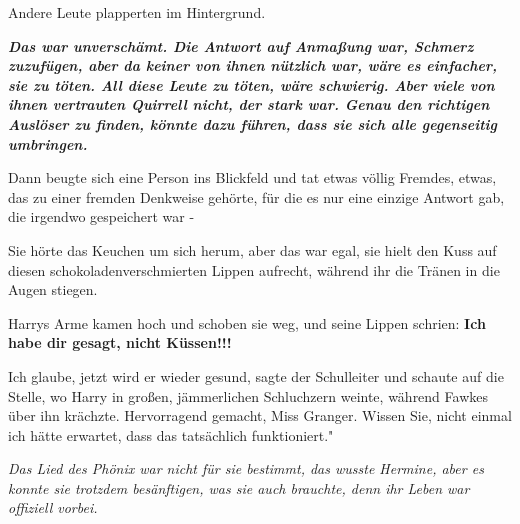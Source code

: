 Andere Leute plapperten im Hintergrund.

\textbf{\emph{Das war unverschämt. Die Antwort auf Anmaßung war, Schmerz
zuzufügen, aber da keiner von ihnen nützlich war, wäre es einfacher, sie zu
töten. All diese Leute zu töten, wäre schwierig. Aber viele von ihnen vertrauten
Quirrell nicht, der stark war. Genau den richtigen Auslöser zu finden, könnte
dazu führen, dass sie sich alle gegenseitig umbringen.}}

Dann beugte sich eine Person ins Blickfeld und tat etwas völlig Fremdes, etwas,
das zu einer fremden Denkweise gehörte, für die es nur eine einzige Antwort gab,
die irgendwo gespeichert war -

Sie hörte das Keuchen um sich herum, aber das war egal, sie hielt den Kuss auf
diesen schokoladenverschmierten Lippen aufrecht, während ihr die Tränen in die
Augen stiegen.

Harrys Arme kamen hoch und schoben sie weg, und seine Lippen schrien: \textbf{
\glqq{}Ich habe dir gesagt, nicht Küssen!!!\grqq{}}

\glqq{}Ich glaube, jetzt wird er wieder gesund\grqq{}, sagte der Schulleiter und
schaute auf die Stelle, wo Harry in großen, jämmerlichen Schluchzern weinte,
während Fawkes über ihn krächzte. \glqq{}Hervorragend gemacht, Miss Granger.
Wissen Sie, nicht einmal ich hätte erwartet, dass das tatsächlich funktioniert."

\emph{Das Lied des Phönix war nicht für sie bestimmt, das wusste Hermine, aber
es konnte sie trotzdem besänftigen, was sie auch brauchte, denn ihr Leben war
offiziell vorbei.}

